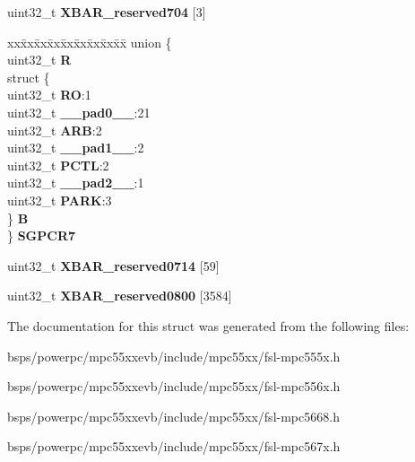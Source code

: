 \begin{DoxyCompactItemize}
\begin{tabbing}
\end{tabbing}\item 
\mbox{\label{structXBAR__tag_a774d2ba15c8a22c876a1f3314747b0c1}} 
uint32\+\_\+t {\bfseries X\+B\+A\+R\+\_\+reserved704} \mbox{[}3\mbox{]}
\item 
\mbox{\label{structXBAR__tag_ad6c234e0d012039812769c6afe7de54a}} 
\begin{tabbing}
xx\=xx\=xx\=xx\=xx\=xx\=xx\=xx\=xx\=\kill
union \{\\
\>uint32\_t {\bfseries R}\\
\>struct \{\\
\>\>uint32\_t {\bfseries RO}:1\\
\>\>uint32\_t {\bfseries \_\_pad0\_\_}:21\\
\>\>uint32\_t {\bfseries ARB}:2\\
\>\>uint32\_t {\bfseries \_\_pad1\_\_}:2\\
\>\>uint32\_t {\bfseries PCTL}:2\\
\>\>uint32\_t {\bfseries \_\_pad2\_\_}:1\\
\>\>uint32\_t {\bfseries PARK}:3\\
\>\} {\bfseries B}\\
\} {\bfseries SGPCR7}\\

\end{tabbing}\item 
\mbox{\label{structXBAR__tag_a30426fb6c433c7e1cc6697e480c183f7}} 
uint32\+\_\+t {\bfseries X\+B\+A\+R\+\_\+reserved0714} \mbox{[}59\mbox{]}
\item 
\mbox{\label{structXBAR__tag_a09eafbc21549b03fba79f488f88148df}} 
uint32\+\_\+t {\bfseries X\+B\+A\+R\+\_\+reserved0800} \mbox{[}3584\mbox{]}
\end{DoxyCompactItemize}


The documentation for this struct was generated from the following files\+:\begin{DoxyCompactItemize}
\item 
bsps/powerpc/mpc55xxevb/include/mpc55xx/fsl-\/mpc555x.\+h\item 
bsps/powerpc/mpc55xxevb/include/mpc55xx/fsl-\/mpc556x.\+h\item 
bsps/powerpc/mpc55xxevb/include/mpc55xx/fsl-\/mpc5668.\+h\item 
bsps/powerpc/mpc55xxevb/include/mpc55xx/fsl-\/mpc567x.\+h\end{DoxyCompactItemize}
